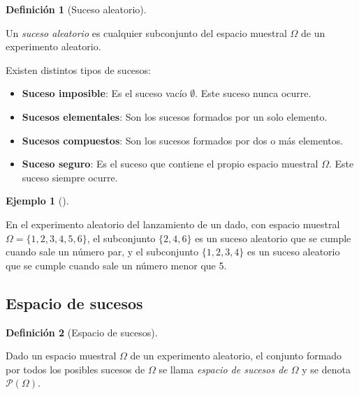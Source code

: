 \documentclass[
  a4paper,
]{scrreport}
\providecommand{\tightlist}{%
  \setlength{\itemsep}{0pt}\setlength{\parskip}{0pt}}\usepackage{longtable,booktabs,array}
\theoremstyle{plain}
\theoremstyle{definition}
\newtheorem{definition}{Definición}[chapter]
\theoremstyle{definition}
\newtheorem{example}{Ejemplo}[chapter]
\theoremstyle{remark}
\begin{document}
\begin{definition}[Suceso
aleatorio]\protect\hypertarget{def-suceso-aleatorio}{}\label{def-suceso-aleatorio}

Un \emph{suceso aleatorio} es cualquier subconjunto del espacio muestral
\(\Omega\) de un experimento aleatorio.

\end{definition}

Existen distintos tipos de sucesos:

\begin{itemize}
\tightlist
\item
  \textbf{Suceso imposible}: Es el suceso vacío \(\emptyset\). Este
  suceso nunca ocurre.
\item
  \textbf{Sucesos elementales}: Son los sucesos formados por un solo
  elemento.
\item
  \textbf{Sucesos compuestos}: Son los sucesos formados por dos o más
  elementos.
\item
  \textbf{Suceso seguro}: Es el suceso que contiene el propio espacio
  muestral \(\Omega\). Este suceso siempre ocurre.
\end{itemize}

\begin{example}[]\protect\hypertarget{exm-sucesos-aleatorios}{}\label{exm-sucesos-aleatorios}

En el experimento aleatorio del lanzamiento de un dado, con espacio
muestral \(\Omega=\{1, 2, 3, 4, 5, 6\}\), el subconjunto \(\{2, 4, 6\}\)
es un suceso aleatorio que se cumple cuando sale un número par, y el
subconjunto \(\{1, 2, 3, 4\}\) es un suceso aleatorio que se cumple
cuando sale un número menor que 5.

\end{example}

\subsection{Espacio de sucesos}\label{espacio-de-sucesos}

\begin{definition}[Espacio de
sucesos]\protect\hypertarget{def-espacio-sucesos}{}\label{def-espacio-sucesos}

Dado un espacio muestral \(\Omega\) de un experimento aleatorio, el
conjunto formado por todos los posibles sucesos de \(\Omega\) se llama
\emph{espacio de sucesos de \(\Omega\)} y se denota
\(\mathcal{P}(\Omega)\).

\end{definition}
\end{document}
